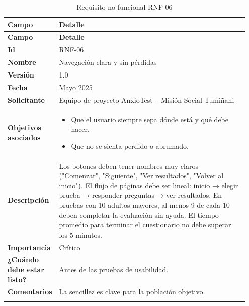 \begin{longtable}{p{0.15\linewidth} p{0.80\linewidth}}
\toprule
\rowcolor{tableheader!20}
\textbf{Campo} & \textbf{Detalle} \\
\midrule
\endfirsthead
\rowcolor{tableheader!20}
\textbf{Campo} & \textbf{Detalle} \\
\midrule
\endhead
\bottomrule
\endfoot
\textbf{Id} & RNF-06 \\
\textbf{Nombre} & Navegación clara y sin pérdidas \\
\textbf{Versión} & 1.0 \\
\textbf{Fecha} & Mayo 2025 \\
\textbf{Solicitante} & Equipo de proyecto AnxioTest – Misión Social Tumiñahi \\
\textbf{Objetivos asociados} & 
  \begin{itemize}
    \item Que el usuario siempre sepa dónde está y qué debe hacer.
    \item Que no se sienta perdido o abrumado.
  \end{itemize} \\
\textbf{Descripción} & Los botones deben tener nombres muy claros ("Comenzar", "Siguiente", "Ver resultados", "Volver al inicio"). El flujo de páginas debe ser lineal: inicio → elegir prueba → responder preguntas → ver resultados. En pruebas con 10 adultos mayores, al menos 9 de cada 10 deben completar la evaluación sin ayuda. El tiempo promedio para terminar el cuestionario no debe superar los 5 minutos. \\
\textbf{Importancia} & Crítico \\
\textbf{¿Cuándo debe estar listo?} & Antes de las pruebas de usabilidad. \\
\textbf{Comentarios} & La sencillez es clave para la población objetivo. \\
\bottomrule
\caption{Requisito no funcional RNF-06}
\end{longtable}

